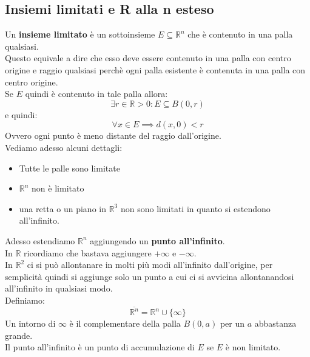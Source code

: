 \documentclass[12pt,a4paper]{article}
\begin{document}
\subsection{Insiemi limitati e R alla n esteso}
Un \textbf{insieme limitato} è un sottoinsieme $E \subseteq \mathbb{R}^n$ che è contenuto in una palla qualsiasi.\\
Questo equivale a dire che esso deve essere contenuto in una palla con centro origine e raggio qualsiasi perchè ogni palla esistente è contenuta in una palla con centro origine.\\
Se $E$ quindi è contenuto in tale palla allora:
\[
\exists r \in \mathbb{R} > 0 : E \subseteq B(0,r)
\]
e quindi:
\[
\forall x \in E \implies d(x,0) < r
\]
Ovvero ogni punto è meno distante del raggio dall'origine.\\
Vediamo adesso alcuni dettagli:
\begin{itemize}
  \item Tutte le palle sono limitate
  \item $\mathbb{R}^n$ non è limitato
  \item una retta o un piano in $\mathbb{R}^3$ non sono limitati in quanto si estendono all'infinito.
\end{itemize}
Adesso estendiamo $\mathbb{R}^n$ aggiungendo un \textbf{punto all'infinito}.\\
In $\mathbb{R}$ ricordiamo che bastava aggiungere $+\infty$ e $-\infty$.\\
In $\mathbb{R}^2$ ci si può allontanare in molti più modi all'infinito dall'origine, per semplicità quindi si aggiunge solo un punto a cui ci si avvicina allontanandosi all'infinito in qualsiasi modo.\\
Definiamo:
\[
\overline{\mathbb{R}^n} = \mathbb{R}^n \cup \{\infty\}
\]
Un intorno di $\infty$ è il complementare della palla $B(0,a)$ per un $a$ abbastanza grande.\\
Il punto all'infinito è un punto di accumulazione di $E$ se $E$ è non limitato.
\end{document}
